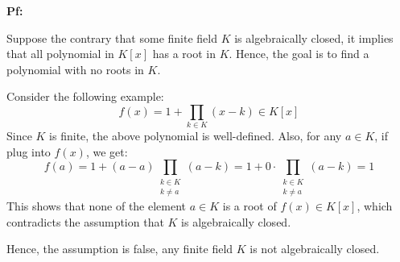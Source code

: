 \documentclass{article}
\begin{document}
\textbf{Pf:}

Suppose the contrary that some finite field $K$ is algebraically closed, it implies that all polynomial in $K[x]$ has a root in $K$. Hence, the goal is to find a polynomial with no roots in $K$.

Consider the following example:
$$f(x)=1+\prod_{k\in K}(x-k)\in K[x]$$
Since $K$ is finite, the above polynomial is well-defined. Also, for any $a\in K$, if plug into $f(x)$, we get:
$$f(a)=1+(a-a)\prod_{\substack{k\in K\\k\neq a}}(a-k) = 1+0\cdot \prod_{\substack{k\in K\\k\neq a}}(a-k) = 1$$
This shows that none of the element $a\in K$ is a root of $f(x)\in K[x]$, which contradicts the assumption that $K$ is algebraically closed.

Hence, the assumption is false, any finite field $K$ is not algebraically closed.
\end{document}
